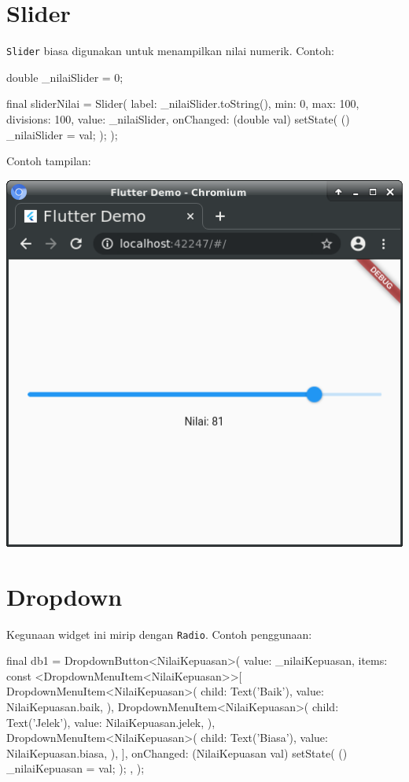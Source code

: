 \documentclass[a4paper,11pt]{article} %
\newcommand{\txtinline}[1]{\texttt{#1}}
\begin{document}
\section{Slider}

\txtinline{Slider} biasa digunakan untuk menampilkan nilai numerik.
Contoh:
\begin{dartcode}
double _nilaiSlider = 0;

final sliderNilai = Slider(
  label: _nilaiSlider.toString(),
  min: 0, max: 100,
  divisions: 100,
  value: _nilaiSlider,
  onChanged: (double val) {
    setState( () {
      _nilaiSlider = val;
    });
  }
);
\end{dartcode}

Contoh tampilan:

{\centering
\includegraphics[scale=0.5]{images/SliderDouble1.png}
\par}


\section{Dropdown}

Kegunaan widget ini mirip dengan \txtinline{Radio}.
Contoh penggunaan:
\begin{dartcode}
final db1 = DropdownButton<NilaiKepuasan>(
  value: _nilaiKepuasan,
  items: const <DropdownMenuItem<NilaiKepuasan>>[
    DropdownMenuItem<NilaiKepuasan>(
      child: Text('Baik'),
      value: NilaiKepuasan.baik,
    ),
    DropdownMenuItem<NilaiKepuasan>(
      child: Text('Jelek'),
      value: NilaiKepuasan.jelek,
    ),
    DropdownMenuItem<NilaiKepuasan>(
      child: Text('Biasa'),
      value: NilaiKepuasan.biasa,
    ),
  ],
  onChanged: (NilaiKepuasan val) {
    setState( () {
      _nilaiKepuasan = val;
    });
  },
);
\end{dartcode}
\end{document}
